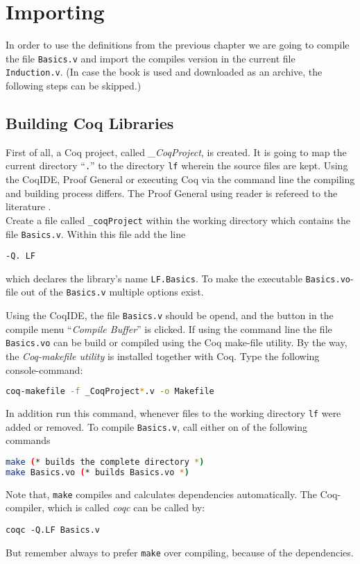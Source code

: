 \section{Importing}


In order to use the definitions from the previous chapter we are going to compile the file 
\texttt{Basics.v} and import the compiles version in the current file \texttt{Induction.v}.
(In case the book \cite{PACGGHSY} is used and downloaded as an archive, the following steps can be skipped.)   

\subsection{Building Coq Libraries}

First of all, a Coq project, called {\itshape \_CoqProject}, is created.  
It is going to map the current directory ``\texttt{.}'' to the directory \texttt{lf} wherein the source files are kept.
Using the CoqIDE, Proof General or executing Coq via the command line the compiling and building process differs.
The Proof General using reader is refereed to the literature \cite[Section, Induction, Proof by Induction]{PACGGHSY}.\\

Create a file called \texttt{\_coqProject} within the working directory which contains the file \texttt{Basics.v}.
Within this file add the line 

\begin{lstlisting}
-Q. LF
\end{lstlisting}

which declares the library's name \texttt{LF.Basics}. 
To make the executable \texttt{Basics.vo}-file out of the \texttt{Basics.v} multiple options exist.

Using the CoqIDE, the file \texttt{Basics.v} should be opend, and the button in the compile menu  ``{\itshape Compile Buffer}'' is clicked.
If using the command line the file \texttt{Basics.vo} can be build or compiled using the Coq  make-file utility.
By the way, the {\itshape Coq-makefile utility } is installed together with Coq.
Type the following console-command:
\begin{lstlisting}[language=bash]
coq-makefile -f _CoqProject*.v -o Makefile
\end{lstlisting}

In addition run this command, whenever files to the working directory \texttt{lf} were added or removed.
To compile \texttt{Basics.v}, call either on of the following commands 
\begin{lstlisting}[language=bash]
make (* builds the complete directory *)
make Basics.vo (* builds Basics.vo *)
\end{lstlisting}
Note that, \lstinline!make! compiles and calculates dependencies automatically. 
The Coq-compiler, which is called {\itshape coqc} can be called by: 
\begin{lstlisting}
coqc -Q.LF Basics.v
\end{lstlisting}
But remember always to prefer \texttt{make} over compiling, because of the dependencies.\\
 
